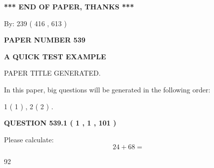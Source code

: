\documentclass[12pt]{article}
\begin{document}
   
   
   
\vspace{1.0in} 
{\textbf{\large{ *** END OF PAPER, THANKS *** }}} 
   
   
\hspace{1.0in} By: 
 239 ( 416 ,  613 )
   
   
   
   
\newpage 
\setcounter{page}{ 
   539001 } 
   
   
   
   
 {\textbf{ \Large{ PAPER NUMBER  539  }}}
   
   
\vspace{0.2in}
   
   
   
   
   
   
   
   
 \vspace{0.2in}
{\LARGE {\textbf{ A QUICK TEST EXAMPLE}}}
   
   
 PAPER TITLE GENERATED.
   
   
   
\vspace{0.2in}
   
In this paper, big questions will be generated in the following order: 
   
   
   1 ( 1 )
 ,
   2 ( 2 )
 .
  
\vspace{0.2in}
  
{\textbf{\Large{QUESTION
539.1 
 ( 1 , 1 , 101 )
}}}
  
  
 
Please calculate:
\begin{equation}
24 +  %
68 = \nonumber
\end{equation}
 
 
 
\noindent{}
 
 

92
 
 
\noindent{}
 
 

 
 
 
\noindent{}
 
\end{document}
